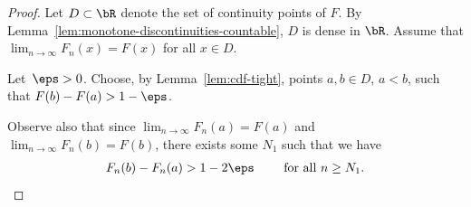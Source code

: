 \begin{proof}
  Let $D \subset \bR$ denote the set of continuity points of $F$. By
  Lemma~\ref{lem:monotone-discontinuities-countable}, $D$ is dense in $\bR$.
  Assume that $\lim_{n \to \infty} F_n(x) = F(x)$ for all $x \in D$.

  Let~$\eps > 0$. Choose, by Lemma~\ref{lem:cdf-tight}, points
  $a,b \in D$, $a<b$, such that $F(b) - F(a) > 1 - \eps$.

  Observe also that since $\lim_{n \to \infty} F_n(a) = F(a)$
  and $\lim_{n \to \infty} F_n(b) = F(b)$, there exists some $N_1$ such that
  we have
  \begin{align*}
  F_n(b) - F_n(a) > 1 - 2\eps \qquad \text{ for all } n \geq N_1 .
  \end{align*}


\end{proof}
